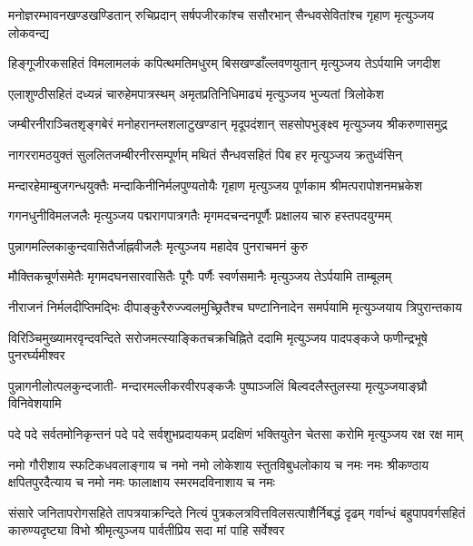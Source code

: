 \fourlineindentedshloka
{मनोज्ञरम्भावनखण्डखण्डितान्}
{रुचिप्रदान् सर्षपजीरकांश्च}
{ससौरभान् सैन्धवसेवितांश्च}
{गृहाण मृत्युञ्जय लोकवन्द्य}%

\fourlineindentedshloka
{हिङ्गूजीरकसहितं}
{विमलामलकं कपित्थमतिमधुरम्}
{बिसखण्डाँल्लवणयुतान्}
{मृत्युञ्जय तेऽर्पयामि जगदीश}%

\fourlineindentedshloka
{एलाशुण्ठीसहितं}
{दध्यन्नं चारुहेमपात्रस्थम्}
{अमृतप्रतिनिधिमाढ्यं}
{मृत्युञ्जय भुज्यतां त्रिलोकेश}%

\fourlineindentedshloka
{जम्बीरनीराञ्चितशृङ्गबेरं}
{मनोहरानम्लशलाटुखण्डान्}
{मृदूपदंशान् सहसोपभुङ्क्ष्व}
{मृत्युञ्जय श्रीकरुणासमुद्र}%

\fourlineindentedshloka
{नागररामठयुक्तं}
{सुललितजम्बीरनीरसम्पूर्णम्}
{मथितं सैन्धवसहितं}
{पिब हर मृत्युञ्जय क्रतुध्वंसिन्}%

\fourlineindentedshloka
{मन्दारहेमाम्बुजगन्धयुक्तैः}
{मन्दाकिनीनिर्मलपुण्यतोयैः}
{गृहाण मृत्युञ्जय पूर्णकाम}
{श्रीमत्परापोशनमभ्रकेश}%

\fourlineindentedshloka
{गगनधुनीविमलजलैः}
{मृत्युञ्जय पद्मरागपात्रगतैः}
{मृगमदचन्दनपूर्णैः}
{प्रक्षालय चारु हस्तपदयुग्मम्}%

\twolineshloka
{पुन्नागमल्लिकाकुन्दवासितैर्जाह्नवीजलैः}
{मृत्युञ्जय महादेव पुनराचमनं कुरु}%

\fourlineindentedshloka
{मौक्तिकचूर्णसमेतैः}
{मृगमदघनसारवासितैः पूगैः}
{पर्णैः स्वर्णसमानैः}
{मृत्युञ्जय तेऽर्पयामि ताम्बूलम्}%

\fourlineindentedshloka
{नीराजनं निर्मलदीप्तिमद्भिः}
{दीपाङ्कुरैरुज्ज्वलमुच्छ्रितैश्च}
{घण्टानिनादेन समर्पयामि}
{मृत्युञ्जयाय त्रिपुरान्तकाय}%

\fourlineindentedshloka
{विरिञ्चिमुख्यामरवृन्दवन्दिते}
{सरोजमत्स्याङ्कितचक्रचिह्निते}
{ददामि मृत्युञ्जय पादपङ्कजे}
{फणीन्द्रभूषे पुनरर्घ्यमीश्वर}%

\fourlineindentedshloka
{पुन्नागनीलोत्पलकुन्दजाती-}
{मन्दारमल्लीकरवीरपङ्कजैः}
{पुष्पाञ्जलिं बिल्वदलैस्तुलस्या}
{मृत्युञ्जयाङ्घ्रौ विनिवेशयामि}%

\fourlineindentedshloka
{पदे पदे सर्वतमोनिकृन्तनं}
{पदे पदे सर्वशुभप्रदायकम्}
{प्रदक्षिणं भक्तियुतेन चेतसा}
{करोमि मृत्युञ्जय रक्ष रक्ष माम्}%

\fourlineindentedshloka
{नमो गौरीशाय स्फटिकधवलाङ्गाय च नमो}
{नमो लोकेशाय स्तुतविबुधलोकाय च नमः}
{नमः श्रीकण्ठाय क्षपितपुरदैत्याय च नमो}
{नमः फालाक्षाय स्मरमदविनाशाय च नमः}%

\fourlineindentedshloka
{संसारे जनितापरोगसहिते तापत्रयाक्रन्दिते}
{नित्यं पुत्रकलत्रवित्तविलसत्पाशैर्निबद्धं दृढम्}
{गर्वान्धं बहुपापवर्गसहितं कारुण्यदृष्ट्या विभो}
{श्रीमृत्युञ्जय पार्वतीप्रिय सदा मां पाहि सर्वेश्वर}%


